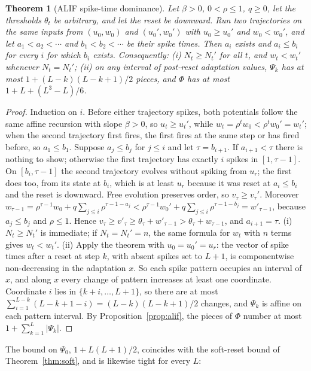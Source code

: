 \documentclass[10pt]{article}
\newtheorem{theorem}{Theorem}
\theoremstyle{remark}
\begin{document}
\begin{theorem}[ALIF spike-time dominance]
\label{thm:alifdom}
Let $\beta>0$, $0<\rho\le1$, $q\ge0$, let the thresholds $\theta_t$ be arbitrary, and let the reset be downward. Run two trajectories on the same inputs from $(u_0,w_0)$ and $(u_0',w_0')$ with $u_0\ge u_0'$ and $w_0<w_0'$, and let $a_1<a_2<\cdots$ and $b_1<b_2<\cdots$ be their spike times. Then $a_i$ exists and $a_i\le b_i$ for every $i$ for which $b_i$ exists. Consequently:
(i) $N_t\ge N_t'$ for all $t$, and $w_t<w_t'$ whenever $N_t=N_t'$;
(ii) on any interval of post-reset adaptation values, $\Psi_k$ has at most $1+(L-k)(L-k+1)/2$ pieces, and $\Phi$ has at most $1+L+(L^3-L)/6$.
\end{theorem}
\begin{proof}
Induction on $i$. Before either trajectory spikes, both potentials follow the same affine recursion with slope $\beta>0$, so $u_t\ge u_t'$, while $w_t=\rho^tw_0<\rho^tw_0'=w_t'$; when the second trajectory first fires, the first fires at the same step or has fired before, so $a_1\le b_1$. Suppose $a_j\le b_j$ for $j\le i$ and let $\tau=b_{i+1}$. If $a_{i+1}<\tau$ there is nothing to show; otherwise the first trajectory has exactly $i$ spikes in $[1,\tau-1]$. On $[b_i,\tau-1]$ the second trajectory evolves without spiking from $u_r$; the first does too, from its state at $b_i$, which is at least $u_r$ because it was reset at $a_i\le b_i$ and the reset is downward. Free evolution preserves order, so $v_\tau\ge v_\tau'$. Moreover $w_{\tau-1}=\rho^{\tau-1}w_0+q\sum_{j\le i}\rho^{\tau-1-a_j}<\rho^{\tau-1}w_0'+q\sum_{j\le i}\rho^{\tau-1-b_j}=w'_{\tau-1}$, because $a_j\le b_j$ and $\rho\le1$. Hence $v_\tau\ge v'_\tau\ge\theta_\tau+w'_{\tau-1}>\theta_\tau+w_{\tau-1}$, and $a_{i+1}=\tau$.
(i) $N_t\ge N_t'$ is immediate; if $N_t=N_t'=n$, the same formula for $w_t$ with $n$ terms gives $w_t<w_t'$.
(ii) Apply the theorem with $u_0=u_0'=u_r$: the vector of spike times after a reset at step $k$, with absent spikes set to $L+1$, is componentwise non-decreasing in the adaptation $x$. So each spike pattern occupies an interval of $x$, and along $x$ every change of pattern increases at least one coordinate. Coordinate $i$ lies in $\{k+i,\dots,L+1\}$, so there are at most $\sum_{i=1}^{L-k}(L-k+1-i)=(L-k)(L-k+1)/2$ changes, and $\Psi_k$ is affine on each pattern interval. By Proposition~\ref{prop:alif}, the pieces of $\Phi$ number at most $1+\sum_{k=1}^L|\Psi_k|$.
\end{proof}

The bound on $\Psi_0$, $1+L(L+1)/2$, coincides with the soft-reset bound of Theorem~\ref{thm:soft}, and is likewise tight for every $L$:
\end{document}
